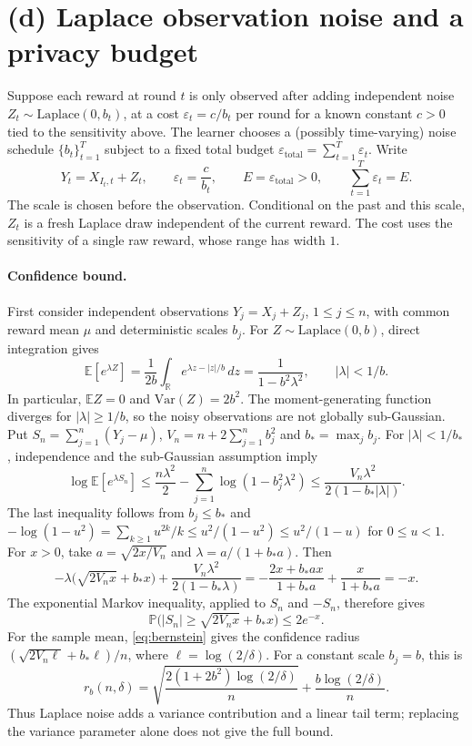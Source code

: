 \section{(d) Laplace observation noise and a privacy budget}\label{sec:noise}

Suppose each reward at round $t$ is only observed after adding independent noise $Z_t\sim\mathrm{Laplace}(0,b_t)$, at a cost $\varepsilon_t=c/b_t$ per round for a known constant $c>0$ tied to the sensitivity above. The learner chooses a (possibly time-varying) noise schedule $\{b_t\}_{t=1}^T$ subject to a fixed total budget $\varepsilon_{\mathrm{total}}=\sum_{t=1}^T\varepsilon_t$. Write
\[
Y_t=X_{I_t,t}+Z_t,\qquad \varepsilon_t=\frac c{b_t},\qquad E=\varepsilon_{\mathrm{total}}>0,\qquad \sum_{t=1}^T\varepsilon_t=E.
\]
The scale is chosen before the observation. Conditional on the past and this scale, $Z_t$ is a fresh Laplace draw independent of the current reward. The cost uses the sensitivity of a single raw reward, whose range has width $1$.

\paragraph{Confidence bound.} First consider independent observations $Y_j=X_j+Z_j$, $1\le j\le n$, with common reward mean $\mu$ and deterministic scales $b_j$. For $Z\sim\mathrm{Laplace}(0,b)$, direct integration gives
\[
\mathbb E[e^{\lambda Z}]=\frac1{2b}\int_{\mathbb R}e^{\lambda z-|z|/b}\,dz=\frac1{1-b^2\lambda^2},\qquad|\lambda|<1/b.
\]
In particular, $\mathbb EZ=0$ and $\mathrm{Var}(Z)=2b^2$. The moment-generating function diverges for $|\lambda|\ge1/b$, so the noisy observations are not globally sub-Gaussian. Put $S_n=\sum_{j=1}^n(Y_j-\mu)$, $V_n=n+2\sum_{j=1}^nb_j^2$ and $b_*=\max_jb_j$. For $|\lambda|<1/b_*$, independence and the sub-Gaussian assumption imply
\begin{equation}\label{eq:subgamma}
\log\mathbb E[e^{\lambda S_n}]\le\frac{n\lambda^2}2-\sum_{j=1}^n\log(1-b_j^2\lambda^2)\le\frac{V_n\lambda^2}{2(1-b_*|\lambda|)}.
\end{equation}
The last inequality follows from $b_j\le b_*$ and $-\log(1-u^2)=\sum_{k\ge1}u^{2k}/k\le u^2/(1-u^2)\le u^2/(1-u)$ for $0\le u<1$. For $x>0$, take $a=\sqrt{2x/V_n}$ and $\lambda=a/(1+b_*a)$. Then
\[
-\lambda\bigl(\sqrt{2V_nx}+b_*x\bigr)+\frac{V_n\lambda^2}{2(1-b_*\lambda)}=-\frac{2x+b_*ax}{1+b_*a}+\frac{x}{1+b_*a}=-x.
\]
The exponential Markov inequality, applied to $S_n$ and $-S_n$, therefore gives
\begin{equation}\label{eq:bernstein}
\mathbb P\bigl(|S_n|\ge\sqrt{2V_nx}+b_*x\bigr)\le2e^{-x}.
\end{equation}
For the sample mean, \eqref{eq:bernstein} gives the confidence radius $(\sqrt{2V_n\ell}+b_*\ell)/n$, where $\ell=\log(2/\delta)$. For a constant scale $b_j=b$, this is
\begin{equation}\label{eq:rb}
r_b(n,\delta)=\sqrt{\frac{2(1+2b^2)\log(2/\delta)}n}+\frac{b\log(2/\delta)}n.
\end{equation}
Thus Laplace noise adds a variance contribution and a linear tail term; replacing the variance parameter alone does not give the full bound.

